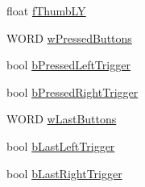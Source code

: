 \begin{DoxyCompactItemize}
\item 
float \hyperlink{struct_d_x_u_t___g_a_m_e_p_a_d_a0d6c333e7c8a92615c8619d2ca3314cb}{fThumbLY}
\item 
WORD \hyperlink{struct_d_x_u_t___g_a_m_e_p_a_d_acccf5caae649d073326c3f2161e6f5e6}{wPressedButtons}
\item 
bool \hyperlink{struct_d_x_u_t___g_a_m_e_p_a_d_aab17e716af2b0c5493c0023b0fd3d241}{bPressedLeftTrigger}
\item 
bool \hyperlink{struct_d_x_u_t___g_a_m_e_p_a_d_a8e377960f2420151bc8f5adda799a6c3}{bPressedRightTrigger}
\item 
WORD \hyperlink{struct_d_x_u_t___g_a_m_e_p_a_d_ad817873373a29226784fe4ed7c4f4cb9}{wLastButtons}
\item 
bool \hyperlink{struct_d_x_u_t___g_a_m_e_p_a_d_af2aa7513882a92c0c66b74f786b8cc52}{bLastLeftTrigger}
\item 
bool \hyperlink{struct_d_x_u_t___g_a_m_e_p_a_d_af3ac25270da6d465e568b8f35cbb7c16}{bLastRightTrigger}
\end{DoxyCompactItemize}


